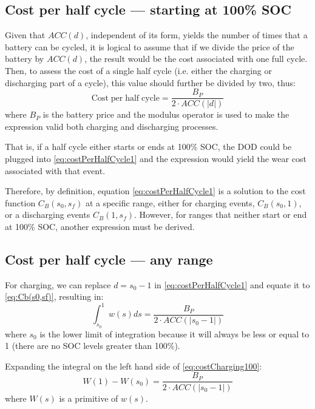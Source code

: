 \documentclass{ieeeaccess}
\begin{document}
    \subsection{Cost per half cycle --- starting at 100\% SOC}
    Given that $ACC(d)$, independent of its form, yields the number of times that a battery can be cycled, it is logical to assume that if we divide the price of the battery by $ACC(d)$, the result would be the cost associated with one full cycle. Then, to assess the cost of a single half cycle (i.e. either the charging or discharging part of a cycle), this value should further be divided by two, thus:
    \begin{equation}
        \mathrm{Cost \; per \; half \; cycle} = \frac{B_{P}}{2 \cdot ACC(|d|)}
        \label{eq:costPerHalfCycle1}
    \end{equation}
    where $B_{P}$ is the battery price and the modulus operator is used to make the expression valid both charging and discharging processes.

    That is, if a half cycle either starts or ends at 100\% SOC, the DOD could be plugged into \eqref{eq:costPerHalfCycle1} and the expression would yield the wear cost associated with that event.

    Therefore, by definition, equation \eqref{eq:costPerHalfCycle1} is a solution to the cost function $C_{B}(s_{0}, s_{f})$ at a specific range, either for charging events, $C_{B}(s_{0}, 1)$, or a discharging events $C_{B}(1, s_{f})$. However, for ranges that neither start or end at 100\% SOC, another expression must be derived.

    \subsection{Cost per half cycle --- any range}

    For charging, we can replace $d=s_{0}-1$ in \eqref{eq:costPerHalfCycle1} and equate it to \eqref{eq:Cb(s0,sf)}, resulting in:
    \begin{equation}
        \int_{s_{0}}^{1}w(s)ds = \frac{B_{P}}{2 \cdot ACC(|s_{0}-1|)}
        \label{eq:costCharging100}
    \end{equation}
    where $s_{0}$ is the lower limit of integration because it will always be less or equal to 1 (there are no SOC levels greater than 100\%).

    Expanding the integral on the left hand side of \eqref{eq:costCharging100}:
    \begin{equation}
        W(1) - W(s_{0}) = \frac{B_{P}}{2 \cdot ACC(|s_{0}-1|)}
        \label{eq:fundamentalTheorem1}
    \end{equation}
    where $W(s)$ is a primitive of $w(s)$.
\end{document}

